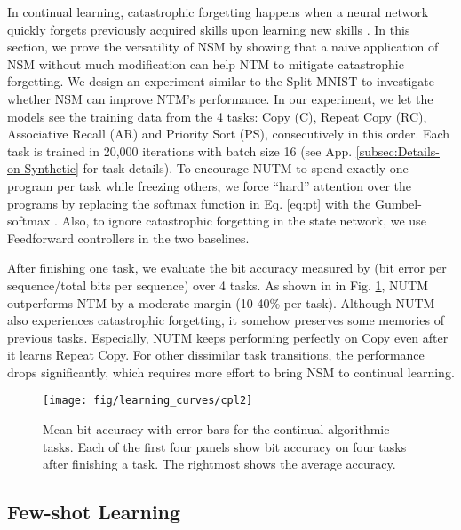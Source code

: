 \documentclass[english]{article}
\renewcommand{\cite}{\citep}
\begin{document}
In continual learning, catastrophic forgetting happens when a neural
network quickly forgets previously acquired skills upon learning new
skills \cite{french1999catastrophic}. In this section, we prove the
versatility of NSM by showing that a naive application of NSM without
much modification can help NTM to mitigate catastrophic forgetting.
We design an experiment similar to the Split MNIST \cite{zenke2017continual}
to investigate whether NSM can improve NTM's performance. In our experiment,
we let the models see the training data from the 4 tasks: Copy (C),
Repeat Copy (RC), Associative Recall (AR) and Priority Sort (PS),
consecutively in this order. Each task is trained in 20,000 iterations
with batch size 16 (see App. \ref{subsec:Details-on-Synthetic} for
task details). To encourage NUTM to spend exactly one program per
task while freezing others, we force ``hard'' attention over the
programs by replacing the softmax function in Eq. \ref{eq:pt} with
the Gumbel-softmax \cite{jang2016categorical}. Also, to ignore catastrophic
forgetting in the state network, we use Feedforward controllers in
the two baselines.

After finishing one task, we evaluate the bit accuracy measured
by (bit error per sequence/total bits per sequence) over 4 tasks.
As shown in in Fig. \ref{fig:Mean-bit-accuracy}, NUTM outperforms
NTM by a moderate margin (10-40\% per task). Although NUTM also experiences
catastrophic forgetting, it somehow preserves some memories of previous
tasks. Especially, NUTM keeps performing perfectly on Copy even after
it learns Repeat Copy. For other dissimilar task transitions, the
performance drops significantly, which requires more effort to bring
NSM to continual learning. 

\begin{figure}
\centering{}\texttt{[image: fig/learning\_curves/cpl2]}\caption{Mean bit accuracy with error bars for the continual algorithmic tasks.
Each of the first four panels show bit accuracy on four tasks after
finishing a task. The rightmost shows the average accuracy.\label{fig:Mean-bit-accuracy}}
\end{figure}

\subsection{Few-shot Learning}
\end{document}
